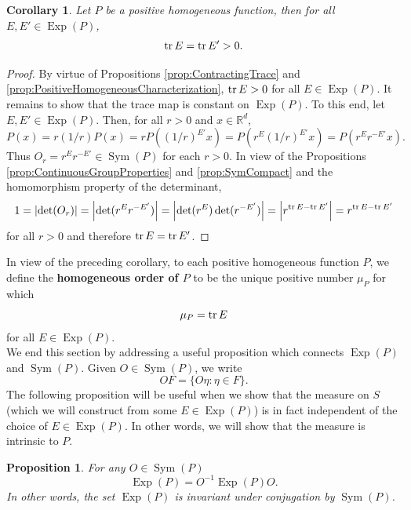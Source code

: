 \documentclass[11pt, letter]{book}
\newtheorem{corollary}[theorem]{Corollary}
\newtheorem{proposition}[theorem]{Proposition}
\newcommand\Sym{\operatorname{Sym}}
\newcommand\Exp{\operatorname{Exp}}
\renewcommand\det{\operatorname{det}}
\begin{document}
\begin{framed}
\begin{corollary}\label{cor:TraceisInvariant}
Let $P$ be a positive homogeneous function, then for all $E,E'\in\Exp(P)$,
\begin{equation*}
\tr E=\tr E'>0.
\end{equation*}
\end{corollary}
\end{framed}
\begin{proof}
By virtue of Propositions \ref{prop:ContractingTrace} and \ref{prop:PositiveHomogeneousCharacterization}, $\tr E>0$ for all $E\in\Exp(P)$. It remains to show that the trace map is constant on $\Exp(P)$. To this end, let $E,E'\in\Exp(P)$. Then, for all $r>0$ and $x\in\mathbb{R}^d$,
\begin{equation*}
P(x)=r(1/r)P(x)=rP((1/r)^{E'}x)=P(r^E(1/r)^{E'}x)=P(r^{E}r^{-E'}x).
\end{equation*}
Thus $O_r=r^{E}r^{-E'}\in\Sym(P)$ for each $r>0$. In view of the Propositions \ref{prop:ContinuousGroupProperties} and \ref{prop:SymCompact} and the homomorphism property of the determinant,
\begin{equation*}
1=\abs{\det(O_r)}=\abs{\det(r^{E}r^{-E'})} = \abs{\det(r^{E})\det(r^{-E'})}=\abs{r^{\tr E-\tr E'}}=r^{\tr E-\tr E'}
\end{equation*}
for all $r>0$ and therefore $\tr E=\tr E'$.
\end{proof}

\noindent In view of the preceding corollary, to each positive homogeneous function $P$, we define the \textbf{homogeneous order of $P$} to be the unique positive number $\mu_P$ for which
\begin{equation*}
\mu_P=\tr E
\end{equation*}
for all $E\in\Exp(P)$. \\



\noindent We end this section by addressing a useful proposition which connects $\Exp(P)$ and $\Sym(P)$. Given $O\in\Sym(P)$, we write
\begin{equation*}
    OF=\{O\eta:\eta\in F\}.
\end{equation*}
The following proposition will be useful when we show that the measure on $S$ (which we will construct from some $E\in \Exp(P)$) is in fact independent of the choice of $E\in \Exp(P)$. In other words, we will show that the measure is intrinsic to $P$. 


\begin{framed}
\begin{proposition}\label{prop:ExpP}
For any  $O \in \Sym{(P)} $
\begin{equation*}
    \Exp(P) = O^{-1} \Exp(P) O.
\end{equation*}
In other words, the set $\Exp(P)$ is invariant under conjugation by $\Sym(P)$.
\end{proposition}
\end{framed}
\end{document}
